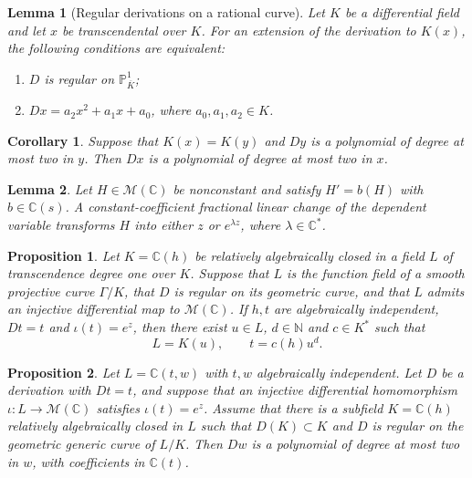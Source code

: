 \documentclass[10pt,a4paper]{amsart}
\newtheorem{lemma}{Lemma}
\newtheorem{corollary}{Corollary}
\newtheorem{proposition}{Proposition}
\newcommand{\C}{\mathbb C}
\newcommand{\MM}{\mathcal M}
\newcommand{\N}{\mathbb N}
\newcommand{\PP}{\mathbb P}
\begin{document}
\begin{lemma}[Regular derivations on a rational curve]
\label{lem:riccati}
Let $K$ be a differential field and let $x$ be transcendental over $K$.
For an extension of the derivation to $K(x)$, the following conditions
are equivalent:
\begin{enumerate}
\item $D$ is regular on $\PP^1_{\overline K}$;
\item $Dx=a_2x^2+a_1x+a_0$, where $a_0,a_1,a_2\in K$.
\end{enumerate}
\end{lemma}

\begin{corollary}
\label{cor:change-generator}
Suppose that $K(x)=K(y)$ and $Dy$ is a polynomial of degree at most two
in $y$. Then $Dx$ is a polynomial of degree at most two in $x$.
\end{corollary}

\begin{lemma}
\label{lem:autonomous}
Let $H\in\MM(\C)$ be nonconstant and satisfy $H'=b(H)$ with
$b\in\C(s)$. A constant-coefficient fractional linear change of the
dependent variable transforms $H$ into either $z$ or $e^{\lambda z}$,
where $\lambda\in\C^*$.
\end{lemma}

\begin{proposition}
\label{prop:two-point}
Let $K=\C(h)$ be relatively algebraically closed in a field $L$ of
transcendence degree one over $K$. Suppose that $L$ is the function
field of a smooth projective curve $\Gamma/K$, that $D$ is regular on
its geometric curve, and that $L$ admits an injective differential map
to $\MM(\C)$. If $h,t$ are algebraically independent,
$Dt=t$ and $\iota(t)=e^z$, then there exist
$u\in L$, $d\in\N$ and $c\in K^*$ such that
\begin{equation}
 L=K(u),\qquad t=c(h)u^d.
 \label{eq:kummer-form}
\end{equation}
\end{proposition}

\begin{proposition}
\label{prop:comparison}
Let $L=\C(t,w)$ with $t,w$ algebraically independent. Let $D$ be a
derivation with $Dt=t$, and suppose that an injective differential
homomorphism $\iota:L\to\MM(\C)$ satisfies $\iota(t)=e^z$.
Assume that there is a subfield $K=\C(h)$ relatively algebraically
closed in $L$ such that $D(K)\subset K$ and $D$ is regular on the
geometric generic curve of $L/K$. Then $Dw$ is a polynomial of degree
at most two in $w$, with coefficients in $\C(t)$.
\end{proposition}
\end{document}
